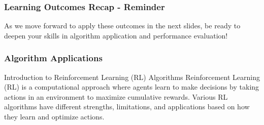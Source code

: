 \documentclass[aspectratio=169]{beamer}
\begin{document}
\begin{frame}[fragile]
    \frametitle{Learning Outcomes Recap - Reminder}
    As we move forward to apply these outcomes in the next slides, be ready to deepen your skills in algorithm application and performance evaluation!
\end{frame}

\begin{frame}[fragile]
    \frametitle{Algorithm Applications}
    \begin{block}{Introduction to Reinforcement Learning (RL) Algorithms}
        Reinforcement Learning (RL) is a computational approach where agents learn to make decisions by taking actions in an environment to maximize cumulative rewards.
        Various RL algorithms have different strengths, limitations, and applications based on how they learn and optimize actions.
    \end{block}
\end{frame}
\end{document}
